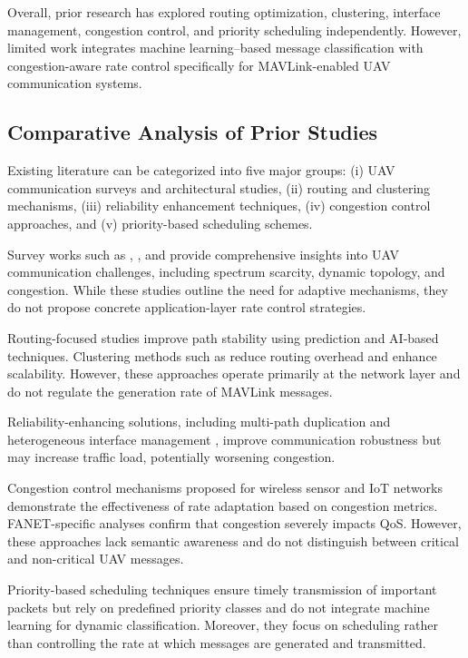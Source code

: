 \documentclass[pdflatex,sn-mathphys-num]{sn-jnl}%
\theoremstyle{thmstyleone}%
\theoremstyle{thmstyletwo}%
\theoremstyle{thmstylethree}%
\begin{document}
Overall, prior research has explored routing optimization, clustering, interface management, congestion control, and priority scheduling independently. However, limited work integrates machine learning–based message classification with congestion-aware rate control specifically for MAVLink-enabled UAV communication systems.

\subsection{Comparative Analysis of Prior Studies}

Existing literature can be categorized into five major groups: (i) UAV communication surveys and architectural studies, (ii) routing and clustering mechanisms, (iii) reliability enhancement techniques, (iv) congestion control approaches, and (v) priority-based scheduling schemes.

Survey works such as \citet{ghamari2022unmanned}, \citet{nawaz2021uav}, and \citet{mohsan2023unmanned} provide comprehensive insights into UAV communication challenges, including spectrum scarcity, dynamic topology, and congestion. While these studies outline the need for adaptive mechanisms, they do not propose concrete application-layer rate control strategies.

Routing-focused studies \citep{rovira2022review,zhang2022adaptive,zhang2023adaptive} improve path stability using prediction and AI-based techniques. Clustering methods such as \citet{yang2022improved} reduce routing overhead and enhance scalability. However, these approaches operate primarily at the network layer and do not regulate the generation rate of MAVLink messages.

Reliability-enhancing solutions, including multi-path duplication \citep{lee2021enabling} and heterogeneous interface management \citep{ribeiro2021communication}, improve communication robustness but may increase traffic load, potentially worsening congestion.

Congestion control mechanisms proposed for wireless sensor and IoT networks \citep{grover2022rate,verma2024adaptive} demonstrate the effectiveness of rate adaptation based on congestion metrics. FANET-specific analyses \citep{anwekar2023analysis} confirm that congestion severely impacts QoS. However, these approaches lack semantic awareness and do not distinguish between critical and non-critical UAV messages.

Priority-based scheduling techniques \citep{li2018prioritizing,halder2022dynamic,yang2025intelligent} ensure timely transmission of important packets but rely on predefined priority classes and do not integrate machine learning for dynamic classification. Moreover, they focus on scheduling rather than controlling the rate at which messages are generated and transmitted.
\end{document}

